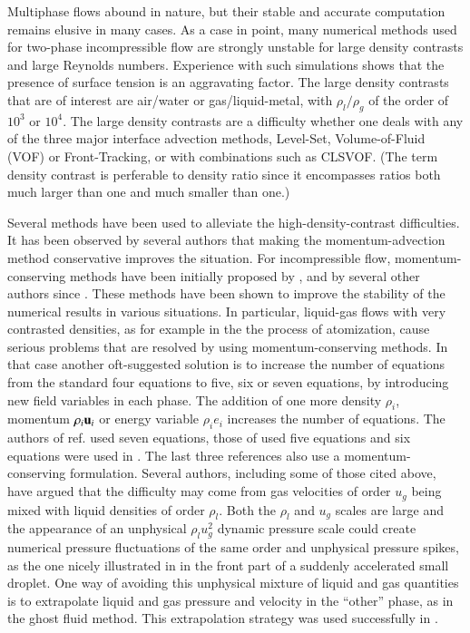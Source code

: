 Multiphase flows abound in nature, but their stable and accurate computation remains elusive in many cases.
As a case in point, many numerical methods used for two-phase incompressible flow are
strongly unstable for large density contrasts and large Reynolds numbers. 
Experience with such simulations shows that the presence of
surface tension is an aggravating factor. The large density contrasts that are of interest are 
 air/water or gas/liquid-metal, with $\rho_l/\rho_g$ of the order of $10^3$ or $10^4$.
The large density contrasts are a difficulty whether one deals with any of the three major
interface advection methods, Level-Set, Volume-of-Fluid (VOF) or Front-Tracking, or with combinations 
such as CLSVOF.  (The term density contrast is perferable to density ratio since it encompasses ratios both much larger than one and much smaller than one.)

Several methods have been used to alleviate the high-density-contrast difficulties.
It has been observed by several authors that making the momentum-advection method conservative improves the situation. 
For incompressible flow, momentum-conserving methods have been initially proposed by \cite{rudman98},
and by several other authors since \cite{bussmann2002modeling,desjardins10,raessi12,le13,Vaudor:2017ip}.
These methods have been shown to
improve the stability of the numerical results in various situations. In particular, liquid-gas flows
 with very contrasted densities, as for example in the the process of atomization,
cause serious problems that are resolved by using momentum-conserving methods. 
In that case another oft-suggested solution is to increase the number of 
equations from the standard four equations to five, six or seven equations, 
by introducing new field variables in each phase. 
The addition of one more density $\rho_i$, momentum $\rho_i {\bf u}_{i}$ or energy variable
$\rho_i e_i$  increases  the number of equations. 
The authors of ref. \cite{Saurel99} used seven equations, 
those of \cite{allaire02} used five equations and six equations were used in \cite{Pelanti14}. 
The last three references also use a momentum-conserving formulation. 
Several authors, including some of those cited above, have argued that the difficulty may come from 
gas velocities of order $u_g$ being mixed with liquid densities of order $\rho_l$. 
Both the $\rho_l$ and $u_g$ scales are large and the appearance of an unphysical $\rho_l u_g^2$ dynamic pressure scale could create numerical pressure fluctuations of the same order and unphysical pressure spikes, 
as the one nicely illustrated in \cite{xiao2012large} in the front part of a
suddenly accelerated small droplet. One way of avoiding this unphysical mixture of liquid and gas
quantities is to extrapolate liquid and gas pressure and velocity in the ``other'' phase, 
as in the ghost fluid method. This extrapolation strategy was used successfully in \cite{Xiao:2014vs}. 


